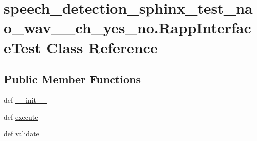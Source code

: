\hypertarget{classspeech__detection__sphinx__test__nao__wav__1__ch__yes__no_1_1RappInterfaceTest}{\section{speech\-\_\-detection\-\_\-sphinx\-\_\-test\-\_\-nao\-\_\-wav\-\_\-\_\-ch\-\_\-yes\-\_\-no.\-Rapp\-Interface\-Test Class Reference}
\label{classspeech__detection__sphinx__test__nao__wav__1__ch__yes__no_1_1RappInterfaceTest}
}
\subsection*{Public Member Functions}
\begin{DoxyCompactItemize}
\item 
def \hyperlink{classspeech__detection__sphinx__test__nao__wav__1__ch__yes__no_1_1RappInterfaceTest_a23128d5107f84f0817d042beea657efe}{\-\_\-\-\_\-init\-\_\-\-\_\-}
\item 
def \hyperlink{classspeech__detection__sphinx__test__nao__wav__1__ch__yes__no_1_1RappInterfaceTest_a1c9406551adaba43f82b3ad78e180d9d}{execute}
\item 
def \hyperlink{classspeech__detection__sphinx__test__nao__wav__1__ch__yes__no_1_1RappInterfaceTest_ab15190b641f396e873e549c5f495bb39}{validate}
\end{DoxyCompactItemize}
